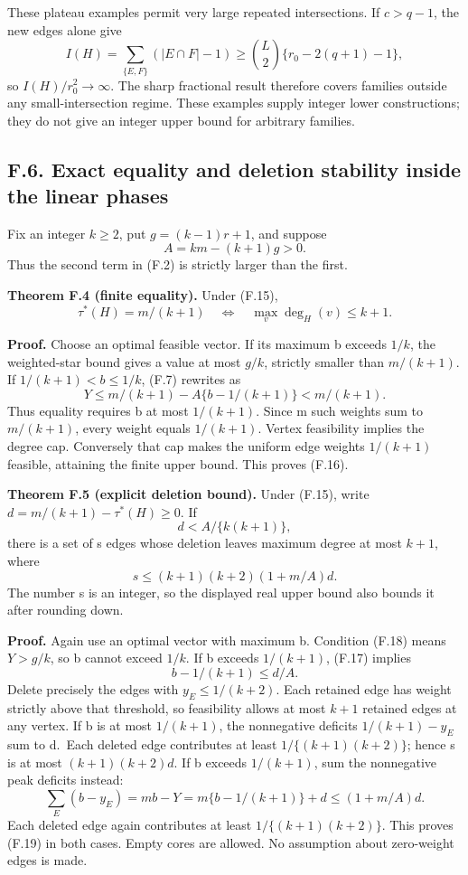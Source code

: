 \documentclass[
  11pt,
]{article}
\begin{document}
These plateau examples permit very large repeated intersections. If
\(c>q-1\), the new edges alone give \[
 I(H)=\sum_{\{E,F\}}(|E\cap F|-1)
   \ge {L\choose2}\{r_0-2(q+1)-1\},
\] so \(I(H)/r_0^2\to\infty\). The sharp fractional result therefore
covers families outside any small-intersection regime. These examples
supply integer lower constructions; they do not give an integer upper
bound for arbitrary families.

\subsection{F.6. Exact equality and deletion stability inside the linear
phases}\label{f.6.-exact-equality-and-deletion-stability-inside-the-linear-phases}

Fix an integer \(k\ge2\), put \(g=(k-1)r+1\), and suppose \[
                 A=km-(k+1)g>0.                            \tag{F.15}
\] Thus the second term in (F.2) is strictly larger than the first.

\textbf{Theorem F.4 (finite equality).} Under (F.15), \[
        \tau^*(H)=m/(k+1)
          \quad\Longleftrightarrow\quad
        \max_v\deg_H(v)\le k+1.                            \tag{F.16}
\]

\textbf{Proof.} Choose an optimal feasible vector. If its maximum b
exceeds \(1/k\), the weighted-star bound gives a value at most \(g/k\),
strictly smaller than \(m/(k+1)\). If \(1/(k+1)<b\le1/k\), (F.7)
rewrites as \[
           Y\le m/(k+1)-A\{b-1/(k+1)\}<m/(k+1).           \tag{F.17}
\] Thus equality requires b at most \(1/(k+1)\). Since m such weights
sum to \(m/(k+1)\), every weight equals \(1/(k+1)\). Vertex feasibility
implies the degree cap. Conversely that cap makes the uniform edge
weights \(1/(k+1)\) feasible, attaining the finite upper bound. This
proves (F.16).

\textbf{Theorem F.5 (explicit deletion bound).} Under (F.15), write
\(d=m/(k+1)-\tau^*(H)\ge0\). If \[
                   d< A/\{k(k+1)\},                        \tag{F.18}
\] there is a set of s edges whose deletion leaves maximum degree at
most \(k+1\), where \[
          s\le (k+1)(k+2)(1+m/A)d.                         \tag{F.19}
\] The number s is an integer, so the displayed real upper bound also
bounds it after rounding down.

\textbf{Proof.} Again use an optimal vector with maximum b. Condition
(F.18) means \(Y>g/k\), so b cannot exceed \(1/k\). If b exceeds
\(1/(k+1)\), (F.17) implies \[
                       b-1/(k+1)\le d/A.                  \tag{F.20}
\] Delete precisely the edges with \(y_E\le1/(k+2)\). Each retained edge
has weight strictly above that threshold, so feasibility allows at most
\(k+1\) retained edges at any vertex. If b is at most \(1/(k+1)\), the
nonnegative deficits \(1/(k+1)-y_E\) sum to d.~Each deleted edge
contributes at least \(1/\{(k+1)(k+2)\}\); hence s is at most
\((k+1)(k+2)d\). If b exceeds \(1/(k+1)\), sum the nonnegative peak
deficits instead: \[
          \sum_E(b-y_E)=mb-Y
            =m\{b-1/(k+1)\}+d\le (1+m/A)d.
\] Each deleted edge again contributes at least \(1/\{(k+1)(k+2)\}\).
This proves (F.19) in both cases. Empty cores are allowed. No assumption
about zero-weight edges is made.
\end{document}
